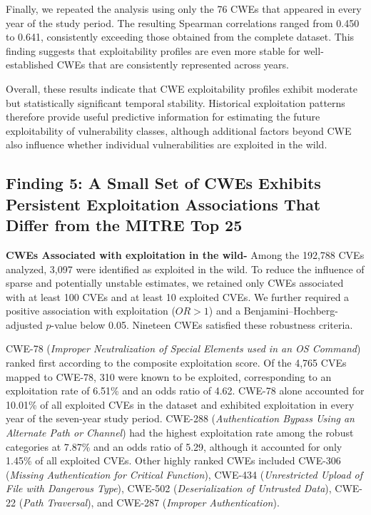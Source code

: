 \documentclass[conference,compsoc]{IEEEtran}
\begin{document}
Finally, we repeated the analysis using only the 76 CWEs that appeared in every year of the study period. The resulting Spearman correlations ranged from 0.450 to 0.641, consistently exceeding those obtained from the complete dataset. This finding suggests that exploitability profiles are even more stable for well-established CWEs that are consistently represented across years.

Overall, these results indicate that CWE exploitability profiles exhibit moderate but statistically significant temporal stability. Historical exploitation patterns therefore provide useful predictive information for estimating the future exploitability of vulnerability classes, although additional factors beyond CWE also influence whether individual vulnerabilities are exploited in the wild.



\subsection{Finding 5: A Small Set of CWEs Exhibits Persistent Exploitation Associations That Differ from the MITRE Top 25}

\textbf{CWEs Associated with exploitation in the wild-} Among the 192,788 CVEs analyzed, 3,097 were identified as exploited in the wild. To reduce the influence of sparse and potentially unstable estimates, we retained only CWEs associated with at least 100 CVEs and at least 10 exploited CVEs. We further required a positive association with exploitation ($OR>1$) and a Benjamini--Hochberg-adjusted $p$-value below 0.05. Nineteen CWEs satisfied these robustness criteria.

CWE-78 (\emph{Improper Neutralization of Special Elements used in an OS Command}) ranked first according to the composite exploitation score. Of the 4,765 CVEs mapped to CWE-78, 310 were known to be exploited, corresponding to an exploitation rate of 6.51\% and an odds ratio of 4.62. CWE-78 alone accounted for 10.01\% of all exploited CVEs in the dataset and exhibited exploitation in every year of the seven-year study period. CWE-288 (\emph{Authentication Bypass Using an Alternate Path or Channel}) had the highest exploitation rate among the robust categories at 7.87\% and an odds ratio of 5.29, although it accounted for only 1.45\% of all exploited CVEs. Other highly ranked CWEs included CWE-306 (\emph{Missing Authentication for Critical Function}), CWE-434 (\emph{Unrestricted Upload of File with Dangerous Type}), CWE-502 (\emph{Deserialization of Untrusted Data}), CWE-22 (\emph{Path Traversal}), and CWE-287 (\emph{Improper Authentication}).
\end{document}
